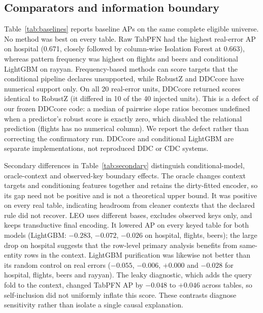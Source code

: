 \subsection{Comparators and information boundary}
Table~\ref{tab:baselines} reports baseline APs on the same complete eligible universe.
No method was best on every table. Raw TabPFN had the highest real-error AP on hospital
(0.671, closely followed by column-wise Isolation Forest at 0.663), whereas pattern
frequency was highest on flights and beers and conditional LightGBM on rayyan.
Frequency-based methods can score targets that the conditional pipeline declares
unsupported, while RobustZ and DDCcore have numerical support only. On all 20
real-error units, DDCcore returned scores identical to RobustZ (it differed in 10 of
the 40 injected units). This is a defect of our frozen DDCcore code: a median of
pairwise slope ratios becomes undefined when a predictor's robust score is exactly
zero, which disabled the relational prediction (flights has no numerical column).
We report the defect rather than correcting the confirmatory run. DDCcore and
conditional LightGBM are separate implementations, not reproduced DDC or CDC systems.


Secondary differences in Table~\ref{tab:secondary} distinguish conditional-model,
oracle-context and observed-key boundary effects. The oracle changes context targets
and conditioning features together and retains the dirty-fitted encoder, so its gap
need not be positive and is not a theoretical upper bound. It was positive on every
real table, indicating headroom from cleaner contexts that the declared rule did not
recover. LEO uses different bases, excludes observed keys only, and keeps transductive
final encoding. It lowered AP on every keyed table for both models (LightGBM:
$-0.283$, $-0.072$, $-0.026$ on hospital, flights, beers); the large drop on hospital
suggests that the row-level primary analysis benefits from same-entity rows in the context. LightGBM purification was likewise
not better than its random control on real errors ($-0.055$, $-0.006$, $+0.000$ and
$-0.028$ for hospital, flights, beers and rayyan). The leaky diagnostic, which adds the
query fold to the context, changed TabPFN AP by $-0.048$ to $+0.046$ across tables, so
self-inclusion did not uniformly inflate this score. These contrasts diagnose
sensitivity rather than isolate a single causal explanation.


